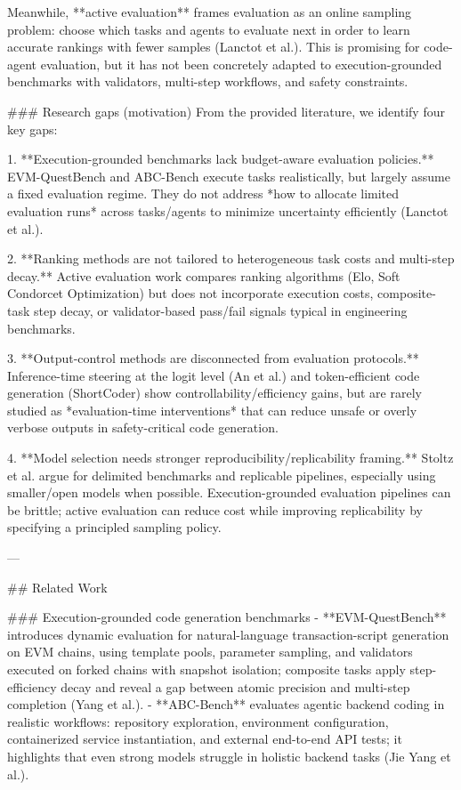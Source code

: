 Meanwhile, **active evaluation** frames evaluation as an online sampling problem: choose which tasks and agents to evaluate next in order to learn accurate rankings with fewer samples (Lanctot et al.). This is promising for code-agent evaluation, but it has not been concretely adapted to execution-grounded benchmarks with validators, multi-step workflows, and safety constraints.

### Research gaps (motivation)  
From the provided literature, we identify four key gaps:

1. **Execution-grounded benchmarks lack budget-aware evaluation policies.**  
   EVM-QuestBench and ABC-Bench execute tasks realistically, but largely assume a fixed evaluation regime. They do not address *how to allocate limited evaluation runs* across tasks/agents to minimize uncertainty efficiently (Lanctot et al.).

2. **Ranking methods are not tailored to heterogeneous task costs and multi-step decay.**  
   Active evaluation work compares ranking algorithms (Elo, Soft Condorcet Optimization) but does not incorporate execution costs, composite-task step decay, or validator-based pass/fail signals typical in engineering benchmarks.

3. **Output-control methods are disconnected from evaluation protocols.**  
   Inference-time steering at the logit level (An et al.) and token-efficient code generation (ShortCoder) show controllability/efficiency gains, but are rarely studied as *evaluation-time interventions* that can reduce unsafe or overly verbose outputs in safety-critical code generation.

4. **Model selection needs stronger reproducibility/replicability framing.**  
   Stoltz et al. argue for delimited benchmarks and replicable pipelines, especially using smaller/open models when possible. Execution-grounded evaluation pipelines can be brittle; active evaluation can reduce cost while improving replicability by specifying a principled sampling policy.

---

## Related Work  

### Execution-grounded code generation benchmarks  
- **EVM-QuestBench** introduces dynamic evaluation for natural-language transaction-script generation on EVM chains, using template pools, parameter sampling, and validators executed on forked chains with snapshot isolation; composite tasks apply step-efficiency decay and reveal a gap between atomic precision and multi-step completion (Yang et al.).  
- **ABC-Bench** evaluates agentic backend coding in realistic workflows: repository exploration, environment configuration, containerized service instantiation, and external end-to-end API tests; it highlights that even strong models struggle in holistic backend tasks (Jie Yang et al.).

